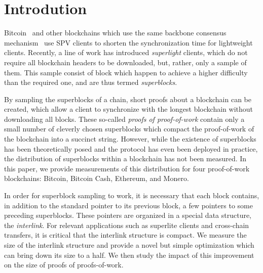 \section{Introdution}

Bitcoin~\cite{bitcoin} and other blockchains which use the same backbone
consensus mechanism~\cite{EC:GarKiaLeo15} use SPV clients to shorten the
synchronization time for lightweight clients. Recently, a line of work has
introduced \emph{superlight} clients, which do not require all blockchain
headers to be downloaded, but, rather, only a sample of them. This sample
consist of block which happen to achieve a higher difficulty than the required
one, and are thus termed \emph{superblocks}.

By sampling the superblocks of a chain, short proofs about a blockchain can be
created, which allow a client to synchronize with the longest blockchain without
downloading all blocks. These so-called \emph{proofs of proof-of-work} contain
only a small number of cleverly chosen superblocks which compact the
proof-of-work of the blockchain into a succinct string. However, while the
existence of superblocks has been theoretically posed and the protocol has even
been deployed in practice, the distribution of superblocks within a blockchain
has not been measured. In this paper, we provide measurements of this
distribution for four proof-of-work blockchains: Bitcoin, Bitcoin Cash,
Ethereum, and Monero.

In order for superblock sampling to work, it is necessary that each block
contains, in addition to the standard pointer to its previous block, a few
pointers to some preceding superblocks. These pointers are organized in a
special data structure, the \emph{interlink}. For relevant applications such as
superlite clients and cross-chain transfers, it is critical that the interlink
structure is compact. We measure the size of the interlink structure and provide
a novel but simple optimization which can bring down its size to a half. We then
study the impact of this improvement on the size of proofs of proofs-of-work.

